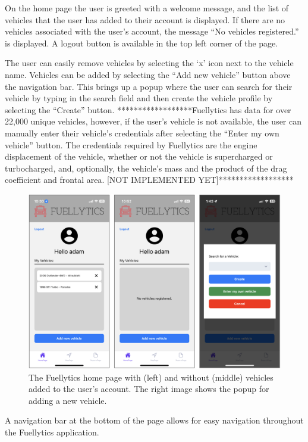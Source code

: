 \documentclass[11pt, oneside]{article}
\begin{document}
On the home page the user is greeted with a welcome message, and the list of vehicles that the user has added to their account is displayed.  If there are no vehicles associated with the user's account, the message ``No vehicles registered.'' is displayed.  A logout button is available in the top left corner of the page.

The user can easily remove vehicles by selecting the `x' icon next to the vehicle name. Vehicles can be added by selecting the ``Add new vehicle'' button above the navigation bar.  This brings up a popup where the user can search for their vehicle by typing in the search field and then create the vehicle profile by selecting the ``Create'' button.  ******************Fuellytics has data for over 22,000 unique vehicles, however, if the user's vehicle is not available, the user can manually enter their vehicle's credentials after selecting the ``Enter my own vehicle'' button.  The credentials required by Fuellytics are the engine displacement of the vehicle, whether or not the vehicle is supercharged or turbocharged, and, optionally, the vehicle's mass and the product of the drag coefficient and frontal area. [NOT IMPLEMENTED YET]******************
\begin{figure}[H]
\centerline{\includegraphics[width=16.5cm]{img/homepage.png}}
\caption{\label{fig:homepage} The Fuellytics home page with (left) and without (middle) vehicles added to the user's account. The right image shows the popup for adding a new vehicle.}
\end{figure}

A navigation bar at the bottom of the page allows for easy navigation throughout the Fuellytics application.
\end{document}
